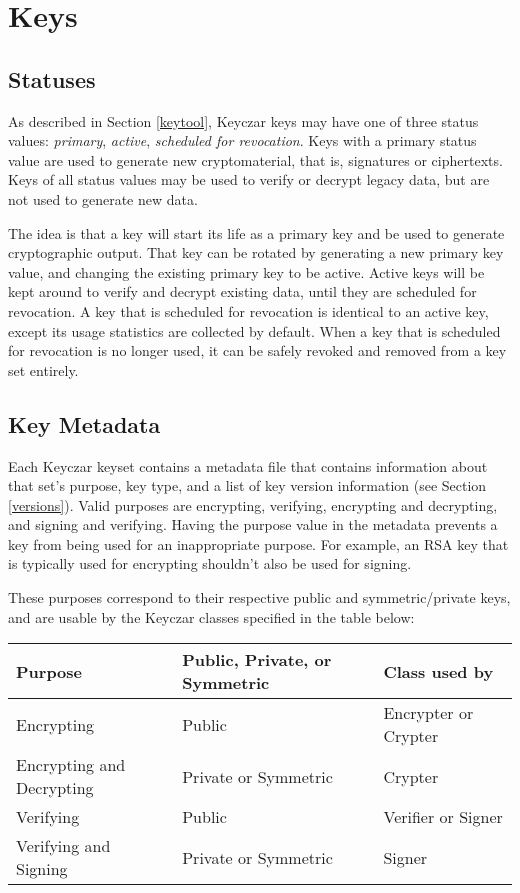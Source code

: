 \documentclass{llncs}
\begin{document}
\section{Keys}

\subsection{Statuses}\label{status}

As described in Section \ref{keytool}, Keyczar keys may have one of three
status values: {\it primary}, {\it active}, {\it scheduled for revocation}.
Keys with a primary status value are used to generate new cryptomaterial, that
is, signatures or ciphertexts. Keys of all status values may be used to verify
or decrypt legacy data, but are not used to generate new data.

The idea is that a key will start its life as a primary key and be used to
generate cryptographic output. That key can be rotated by generating a new
primary key value, and changing the existing primary key to be active. Active
keys will be kept around to verify and decrypt existing data, until they are
scheduled for revocation. A key that is scheduled for revocation is identical
to an active key, except its usage statistics are collected by default. When a
key that is scheduled for revocation is no longer used, it can be safely
revoked and removed from a key set entirely.

\subsection{Key Metadata}\label{metadata}

Each Keyczar keyset contains a metadata file that contains information about
that set's purpose, key type, and a list of key version information (see
Section \ref{versions}). Valid purposes are encrypting, verifying, encrypting
and decrypting, and signing and verifying. Having the purpose value in the
metadata prevents a key from being used for an inappropriate purpose. For
example, an RSA key that is typically used for encrypting shouldn't also be
used for signing.

These purposes correspond to their respective public and symmetric/private
keys, and are usable by the Keyczar classes specified in the table below: 

\vspace*{3mm}
\begin{tabular}{ l | l | l }
{\bf Purpose} &  {\bf Public, Private, or Symmetric } & {\bf Class used by} \\
\hline Encrypting & Public & Encrypter or Crypter \\ \hline
Encrypting and Decrypting & Private or Symmetric & Crypter \\ \hline
Verifying & Public & Verifier or Signer \\ \hline 
Verifying and Signing & Private or Symmetric & Signer \\ \hline
\end{tabular}
\vspace*{3mm}
\end{document}
